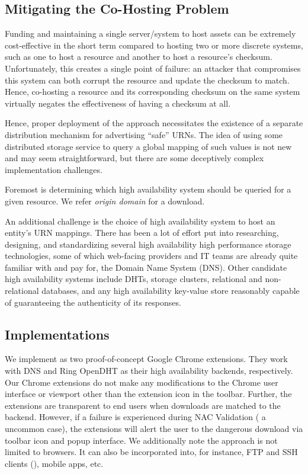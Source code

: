 \subsection{Mitigating the Co-Hosting Problem}

Funding and maintaining a single server/system to host assets can be extremely
cost-effective in the short term compared to hosting two or more discrete
systems, such as one to host a resource and another to host a resource's
checksum. Unfortunately, this creates a single point of failure: an attacker
that compromises this system can both corrupt the resource and update the
checksum to match. Hence, co-hosting a resource and its corresponding checksum
on the same system virtually negates the effectiveness of having a checksum at
all.

Hence, proper deployment of the \SYSTEM{} approach necessitates the existence of
a separate distribution mechanism for advertising ``safe'' URNs. The idea of
using some distributed storage service to query a global mapping of such values
is not new and may seem straightforward, but there are some deceptively complex
implementation challenges.

Foremost is determining which high availability system should be queried for a
given resource. We refer \emph{origin domain} for a download. 

An additional challenge is the choice of high availability system to host an
entity's URN mappings. There has been a lot of effort put into researching,
designing, and standardizing several high availability high performance storage
technologies, some of which web-facing providers and IT teams are already quite
familiar with and pay for, \eg the Domain Name System (DNS). Other candidate
high availability systems include DHTs, storage clusters, relational and
non-relational databases, and any high availability key-value store reasonably
capable of guaranteeing the authenticity of its responses.

\subsection{Implementations}

We implement \SYSTEM{} as two proof-of-concept Google Chrome extensions. They
work with DNS and Ring OpenDHT as their high availability backends,
respectively. Our Chrome extensions do not make any modifications to the Chrome
user interface or viewport other than the extension icon in the toolbar.
Further, the extensions are transparent to end users when downloads are matched
to the backend. However, if a failure is experienced during NAC Validation (\ie
a uncommon case), the extensions will alert the user to the dangerous download
via toolbar icon and popup interface. We additionally note the \SYSTEM{}
approach is not limited to browsers. It can also be incorporated into, for
instance, FTP and SSH clients (), mobile apps, etc.

